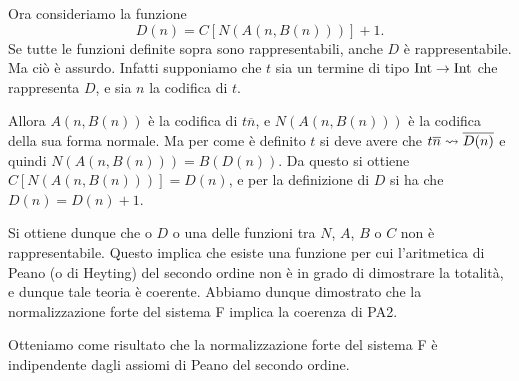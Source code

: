 \documentclass[]{marticle}
\begin{document}
Ora consideriamo la funzione
\[
    D(n) = C[N(A(n, B(n)))] + 1.
\]
Se tutte le funzioni definite sopra sono rappresentabili, anche $D$ \`e
rappresentabile. Ma ci\`o \`e assurdo. Infatti supponiamo che $t$ sia un termine
di tipo $\text{Int}\rightarrow\text{Int}$ che rappresenta $D$, e sia $n$ la codifica di $t$. 

Allora $A(n, B(n))$ \`e la codifica di $t\overline{n}$, e $N(A(n, B(n)))$ \`e la
codifica della sua forma normale. Ma per come \`e definito $t$ si deve avere che
$t\overline{n} \rightsquigarrow \overline{D(n)}$ e quindi $N(A(n, B(n))) = B(D(n))$.
Da questo si ottiene $C[N(A(n, B(n)))] = D(n)$, e per la definizione di $D$ si
ha che $D(n) = D(n)+1$.

Si ottiene dunque che o $D$ o una delle funzioni tra $N$, $A$, $B$ o $C$ non \`e
rappresentabile. Questo implica che esiste una funzione per cui l'aritmetica di
Peano (o di Heyting) del secondo ordine non \`e in grado di dimostrare la
totalit\`a, e dunque tale teoria \`e coerente. Abbiamo dunque dimostrato che la
normalizzazione forte del sistema F implica la coerenza di PA2.

Otteniamo come risultato che la normalizzazione forte del sistema F \`e
indipendente dagli assiomi di Peano del secondo ordine.
\end{document}
